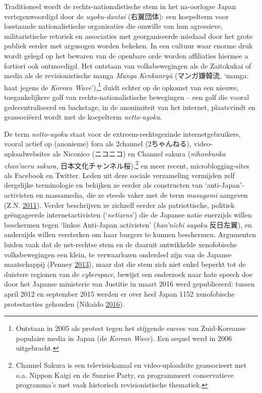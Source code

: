 \documentclass[10.5pt,dutch,]{article}
\begin{document}
Traditioneel wordt de rechts-nationalistische stem in het na-oorlogse
Japan vertegenwoordigd door de \emph{uyoku-dantai} (右翼団体): een
koepelterm voor losstaande nationalistische organisaties die omwille van
hun agressieve, militaristische retoriek en associaties met
georganiseerde misdaad door het grote publiek eerder met argusogen
worden bekeken. In een cultuur waar enorme druk wordt gelegd op het
bewaren van de openbare orde worden affiliaties hiermee a fortiori ook
ontmoedigd. Het ontstaan van volksbewegingen als de Zaitokukai of media
als de revisionistische manga \emph{Manga Kenkanryū} (マンガ嫌韓流,
`manga: haat jegens de \emph{Korean Wave}'),\footnote{Ontstaan in 2005
  als protest tegen het stijgende succes van Zuid-Koreanse populaire
  media in Japan (de \emph{Korean Wave}). Een sequel werd in 2006
  uitgebracht.} duidt echter op de opkomst van een nieuwe,
toegankelijkere golf van rechts-nationalistische bewegingen -- een golf
die vooral gedecentraliseerd en backstage, in de anonimiteit van het
internet, plaatsvindt en geassociëerd wordt met de koepelterm
\emph{netto-uyoku}.

De term \emph{netto-uyoku} staat voor de extreem-rechtsgezinde
internetgebruikers, vooral actief op (anonieme) fora als 2channel
(2ちゃんねる), video-uploadwebsites als Niconico (ニコニコ) en Channel
sakura (\emph{nihonbunka chan'neru sakura},
日本文化チャンネル桜),\footnote{Channel Sakura is een televisiekanaal en
  video-uploadsite geassocieert met o.a. Nippon Kaigi en de Sunrise
  Party, en programmeert conservatieve programma's met vaak historisch
  revisionistische thematiek.} en meer recent, microblogging-sites als
Facebook en Twitter. Leden uit deze sociale verzameling vermijden zelf
dergelijke terminologie en bekijken ze eerder als constructen van
`anti-Japan'-activisten en massamedia, die ze steeds vaker met de term
\emph{masugomi} aangeven (Z.N.
\protect\hyperlink{ref-z.n.ux5fkokuminux5f2011}{2011}). Verder
beschrijven ze zichzelf eerder als patriottische, politiek geëngageerde
internetactivisten (`\emph{netizens}') die de Japanse natie enerzijds
willen beschermen tegen `linkse Anti-Japan activisten' (\emph{han'nichi
sayoku} 反日左翼), en anderzijds willen versterken om haar burgers te
kunnen beschermen. Argumenten luiden vaak dat de net-rechtse stem en de
daaruit ontwikkelde xenofobische volksbewegingen een klein, te
verwaarlozen onderdeel zijn van de Japanse maatschappij (Penney
\protect\hyperlink{ref-penneyux5fracistsux5f2013}{2013}), maar dat die
stem zich niet enkel beperkt tot de duistere regionen van de
\emph{cyberspace}, bewijst een onderzoek naar hate speech doe door het
Japanse ministerie van Justitie in maart 2016 werd gepubliceerd: tussen
april 2012 en september 2015 werden er over heel Japan 1152 xenofobische
protestacties gehouden (Nikaido
\protect\hyperlink{ref-ux5fheitosupiichiux5f2016}{2016}).
\end{document}
